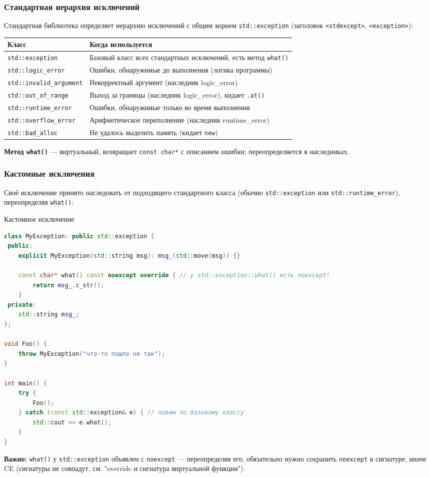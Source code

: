 \subsubsection{Стандартная иерархия исключений}
Стандартная библиотека определяет иерархию исключений с общим корнем \texttt{std::exception} (заголовок \texttt{<stdexcept>}, \texttt{<exception>}):
\begin{center}
\begin{tabular}{|l|l|}
\hline
\textbf{Класс} & \textbf{Когда используется} \\
\hline
\texttt{std::exception} & Базовый класс всех стандартных исключений, есть метод \texttt{what()} \\
\texttt{std::logic\_error} & Ошибки, обнаружимые до выполнения (логика программы) \\
\texttt{std::invalid\_argument} & Некорректный аргумент (наследник logic\_error) \\
\texttt{std::out\_of\_range} & Выход за границы (наследник logic\_error), кидает \texttt{.at()} \\
\texttt{std::runtime\_error} & Ошибки, обнаружимые только во время выполнения \\
\texttt{std::overflow\_error} & Арифметическое переполнение (наследник runtime\_error) \\
\texttt{std::bad\_alloc} & Не удалось выделить память (кидает \texttt{new}) \\
\hline
\end{tabular}
\end{center}
\textbf{Метод \texttt{what()}} --- виртуальный, возвращает \texttt{const char*} с описанием ошибки; переопределяется в наследниках.
\subsubsection{Кастомные исключения}
Своё исключение принято наследовать от подходящего стандартного класса (обычно \texttt{std::exception} или \texttt{std::runtime\_error}), переопределяя \texttt{what()}:
\begin{implementation}{Кастомное исключение}{}
\begin{lstlisting}[language=C++]
class MyException: public std::exception {
 public:
    explicit MyException(std::string msg): msg_(std::move(msg)) {}

    const char* what() const noexcept override { // у std::exception::what() есть noexcept!
        return msg_.c_str();
    }
 private:
    std::string msg_;
};

void Foo() {
    throw MyException("что-то пошло не так");
}

int main() {
    try {
        Foo();
    } catch (const std::exception& e) { // ловим по базовому классу
        std::cout << e.what();
    }
}
\end{lstlisting}
\end{implementation}
\textbf{Важно:} \texttt{what()} у \texttt{std::exception} объявлен с \texttt{noexcept} --- переопределяя его, обязательно нужно сохранить \texttt{noexcept} в сигнатуре, иначе CE (сигнатуры не совпадут, см. "override и сигнатура виртуальной функции").
